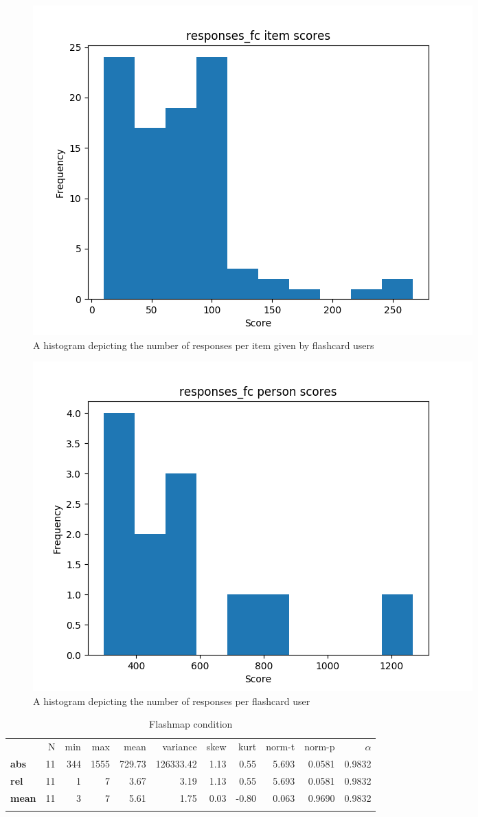 \begin{figure}
    \centering
    \includegraphics[width=.7\textwidth]{img/responses_fc_diff.png}
    \caption{A histogram depicting the number of responses per item given by flashcard users}
    \label{fig:responses_fc_diff}
\end{figure}
\begin{figure}
    \centering
    \includegraphics[width=.7\textwidth]{img/responses_fc_abil.png}
    \caption{A histogram depicting the number of responses per flashcard user}
    \label{fig:responses_fc_abil}
\end{figure}

\begin{longtable}[c]{@{}lrrrrrrrrrr@{}}
\caption{Flashmap condition}
\endfirsthead
\toprule\addlinespace
& N & min & max & mean & variance & skew & kurt & norm-t &
norm-p & $\alpha$
\\\addlinespace
\midrule
\textbf{abs} & 11 & 344 & 1555 & 729.73 & 126333.42 & 1.13 & 0.55 &
5.693 & 0.0581 & 0.9832
\\\addlinespace
\textbf{rel} & 11 & 1 & 7 & 3.67 & 3.19 & 1.13 & 0.55 & 5.693 & 0.0581 &
0.9832
\\\addlinespace
\textbf{mean} & 11 & 3 & 7 & 5.61 & 1.75 & 0.03 & -0.80 & 0.063 & 0.9690
& 0.9832
\\\addlinespace
\bottomrule
    \label{tab:responses_fm}
\end{longtable}

